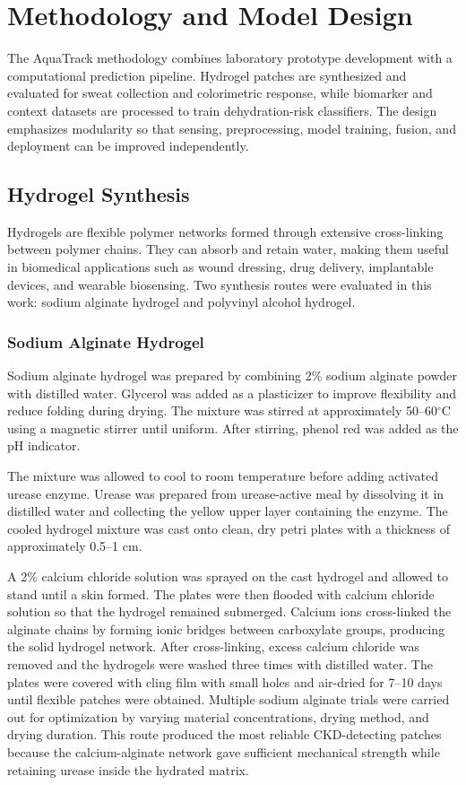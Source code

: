 \chapter{Methodology and Model Design}

The AquaTrack methodology combines laboratory prototype development with a computational prediction pipeline. Hydrogel patches are synthesized and evaluated for sweat collection and colorimetric response, while biomarker and context datasets are processed to train dehydration-risk classifiers. The design emphasizes modularity so that sensing, preprocessing, model training, fusion, and deployment can be improved independently.

\section{Hydrogel Synthesis}

Hydrogels are flexible polymer networks formed through extensive cross-linking between polymer chains. They can absorb and retain water, making them useful in biomedical applications such as wound dressing, drug delivery, implantable devices, and wearable biosensing. Two synthesis routes were evaluated in this work: sodium alginate hydrogel and polyvinyl alcohol hydrogel.

\subsection{Sodium Alginate Hydrogel}

Sodium alginate hydrogel was prepared by combining 2\% sodium alginate powder with distilled water. Glycerol was added as a plasticizer to improve flexibility and reduce folding during drying. The mixture was stirred at approximately 50--60$^\circ$C using a magnetic stirrer until uniform. After stirring, phenol red was added as the pH indicator.

The mixture was allowed to cool to room temperature before adding activated urease enzyme. Urease was prepared from urease-active meal by dissolving it in distilled water and collecting the yellow upper layer containing the enzyme. The cooled hydrogel mixture was cast onto clean, dry petri plates with a thickness of approximately 0.5--1 cm.

A 2\% calcium chloride solution was sprayed on the cast hydrogel and allowed to stand until a skin formed. The plates were then flooded with calcium chloride solution so that the hydrogel remained submerged. Calcium ions cross-linked the alginate chains by forming ionic bridges between carboxylate groups, producing the solid hydrogel network. After cross-linking, excess calcium chloride was removed and the hydrogels were washed three times with distilled water. The plates were covered with cling film with small holes and air-dried for 7--10 days until flexible patches were obtained. Multiple sodium alginate trials were carried out for optimization by varying material concentrations, drying method, and drying duration. This route produced the most reliable CKD-detecting patches because the calcium-alginate network gave sufficient mechanical strength while retaining urease inside the hydrated matrix.

